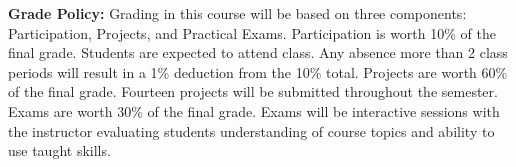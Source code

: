 \vspace*{.25in}
\noindent\textbf{Grade Policy:} 
Grading in this course will be based on three components: Participation, Projects, and Practical Exams.
Participation is worth 10\% of the final grade. Students are expected to attend class. Any absence more than 2 class periods will result in a 1\% deduction from the 10\% total.
Projects are worth 60\% of the final grade. Fourteen projects will be submitted throughout the semester.
Exams are worth 30\% of the final grade. Exams will be interactive sessions with the instructor evaluating students understanding of course topics and ability to use taught skills.